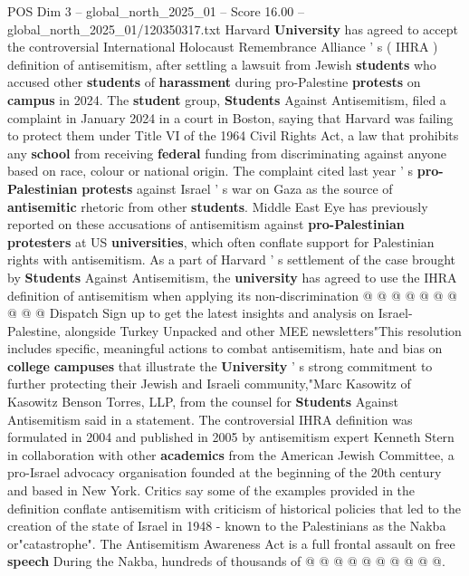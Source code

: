 \begin{textsample}{POS Dim 3 – global\_north\_2025\_01 – Score 16.00 – global\_north\_2025\_01/120350317.txt}  \label{ex:f3_pos_262}
Harvard \textbf{University} has agreed to accept the controversial International Holocaust Remembrance Alliance ' s ( IHRA ) definition of antisemitism, after settling a lawsuit from Jewish \textbf{students} who accused other \textbf{students} of \textbf{harassment} during pro-Palestine \textbf{protests} on \textbf{campus} in 2024.
The \textbf{student} group, \textbf{Students} Against Antisemitism, filed a complaint in January 2024 in a court in Boston, saying that Harvard was failing to protect them under Title VI of the 1964 Civil Rights Act, a law that prohibits any \textbf{school} from receiving \textbf{federal} funding from discriminating against anyone based on race, colour or national origin.
The complaint cited last year ' s \textbf{pro-Palestinian} \textbf{protests} against Israel ' s war on Gaza as the source of \textbf{antisemitic} rhetoric from other \textbf{students}.
Middle East Eye has previously reported on these accusations of antisemitism against \textbf{pro-Palestinian} \textbf{protesters} at US \textbf{universities}, which often conflate support for Palestinian rights with antisemitism.
As a part of Harvard ' s settlement of the case brought by \textbf{Students} Against Antisemitism, the \textbf{university} has agreed to use the IHRA definition of antisemitism when applying its non-discrimination @ @ @ @ @ @ @ @ @ @ Dispatch Sign up to get the latest insights and analysis on Israel-Palestine, alongside Turkey Unpacked and other MEE newsletters"This resolution includes specific, meaningful actions to combat antisemitism, hate and bias on \textbf{college} \textbf{campuses} that illustrate the \textbf{University} ' s strong commitment to further protecting their Jewish and Israeli community,"Marc Kasowitz of Kasowitz Benson Torres, LLP, from the counsel for \textbf{Students} Against Antisemitism said in a statement.
The controversial IHRA definition was formulated in 2004 and published in 2005 by antisemitism expert Kenneth Stern in collaboration with other \textbf{academics} from the American Jewish Committee, a pro-Israel advocacy organisation founded at the beginning of the 20th century and based in New York.
Critics say some of the examples provided in the definition conflate antisemitism with criticism of historical policies that led to the creation of the state of Israel in 1948 - known to the Palestinians as the Nakba or"catastrophe".
The Antisemitism Awareness Act is a full frontal assault on free \textbf{speech} During the Nakba, hundreds of thousands of @ @ @ @ @ @ @ @ @ @.

\end{textsample}
